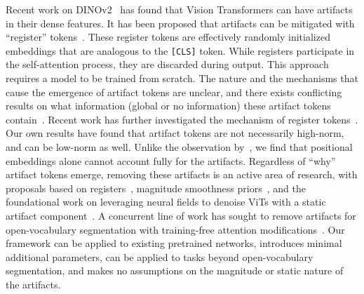  Recent work on DINOv2~\citep{oquab2023dinov2} has found that Vision Transformers can have artifacts in their dense features. It has been proposed that artifacts can be mitigated with ``register'' tokens~\citep{darcet2023vision,burtsev2020memory, xiao2023efficient, jiang2025vision}. These register tokens are effectively randomly initialized embeddings that are analogous to the \texttt{[CLS]} token. While registers participate in the self-attention process, they are discarded during output. This approach requires a model to be trained from scratch. The nature and the mechanisms that cause the emergence of artifact tokens are unclear, and there exists conflicting results on what information (global or no information) these artifact tokens contain~\citep{darcet2023vision,wang2024sinder}. Recent work has further investigated the mechanism of register tokens~\citep{lappe2025registerclstokensyield}. Our own results have found that artifact tokens are not necessarily high-norm, and can be low-norm as well. Unlike the observation by~\citep{yang2024denoising}, we find that positional embeddings alone cannot account fully for the artifacts. Regardless of ``why'' artifact tokens emerge, removing these artifacts is an active area of research, with proposals based on registers~\citep{darcet2023vision}, magnitude smoothness priors~\citep{wang2024sinder}, and the foundational work on leveraging neural fields to denoise ViTs with a static artifact component~\citep{yang2024denoising,yang2023emernerf, luo2024brain}. A concurrent line of work has sought to remove artifacts for open-vocabulary segmentation with training-free attention modifications~\citep{zhou2022extract, LI2025111409,wang2024scliprethinkingselfattentiondense,bousselham2023groundingeverythingemerginglocalization, lan2024clearclip, hajimiri2025naclip}. Our framework can be applied to existing pretrained networks, introduces  minimal additional parameters, can be applied to tasks beyond open-vocabulary segmentation, and makes no assumptions on the magnitude or static nature of the artifacts.
